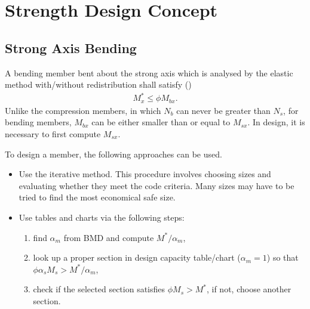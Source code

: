 \section{Strength Design Concept}
\subsection{Strong Axis Bending}
A bending member bent about the strong axis which is analysed by the elastic method with/without redistribution shall satisfy ()
\begin{gather}
M^*_x\leqslant\phi{}M_{bx}.
\end{gather}
Unlike the compression members, in which $N_b$ can never be greater than $N_s$, for bending members, $M_{bx}$ can be either smaller than or equal to $M_{sx}$.
In design, it is necessary to first compute $M_{sx}$.

To design a member, the following approaches can be used.
\begin{itemize}
\item Use the iterative method.
This procedure involves choosing sizes and evaluating whether they meet the code criteria.
Many sizes may have to be tried to find the most economical safe size.
\item Use tables and charts via the following steps:
\begin{enumerate}
\item find $\alpha_m$ from BMD and compute $M^*/\alpha_m$,
\item look up a proper section in design capacity table/chart ($\alpha_m=1$) so that $\phi{}\alpha_sM_s>M^*/\alpha_m$,
\begin{figure}[H]
\centering

\end{figure}
\item check if the selected section satisfies $\phi{}M_s>M^*$, if not, choose another section.
\end{enumerate}
\end{itemize}
